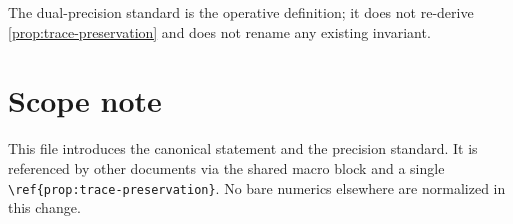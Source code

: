\documentclass[11pt]{article}
\begin{document}
The dual-precision standard is the operative definition; it does not
re-derive \autoref{prop:trace-preservation} and does not rename any
existing invariant.

\section{Scope note}
This file introduces the canonical statement and the precision standard.
It is referenced by other documents via the shared macro block and a single
\verb|\ref{prop:trace-preservation}|. No bare numerics elsewhere are
normalized in this change.
\end{document}
